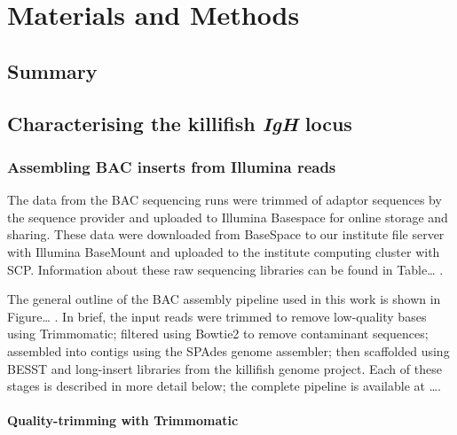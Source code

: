 
\chapter{Materials and Methods}
\onehalfspacing


%

\section*{Summary} %

\pagebreak


\section{Characterising the killifish \textit{IgH} locus}


\subsection{Assembling BAC inserts from Illumina reads}

The data from the BAC sequencing runs were trimmed of adaptor sequences by the sequence provider and uploaded to Illumina Basespace %
for online storage and sharing. These data were downloaded from BaseSpace to our institute file server with Illumina BaseMount %
and uploaded to the institute computing cluster with SCP. %
Information about these raw sequencing libraries can be found in Table\dots %
. 

The general outline of the BAC assembly pipeline used in this work is shown in Figure\dots %
. In brief, the input reads were trimmed to remove low-quality bases using Trimmomatic; filtered using Bowtie2 to remove contaminant sequences; assembled into contigs using the SPAdes genome assembler; then scaffolded using BESST and long-insert libraries from the killifish genome project. %
Each of these stages is described in more detail below; the complete pipeline is available at \dots .

\subsubsection{Quality-trimming with Trimmomatic}

